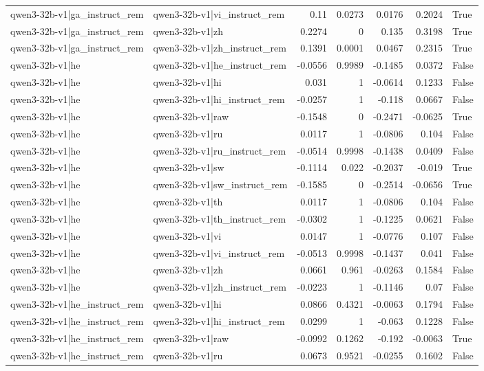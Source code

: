 \begin{table}
\begin{tabular}{l l r r r r l}
qwen3-32b-v1|ga_instruct_rem & qwen3-32b-v1|vi_instruct_rem & 0.11 & 0.0273 & 0.0176 & 0.2024 & True \\
qwen3-32b-v1|ga_instruct_rem & qwen3-32b-v1|zh & 0.2274 & 0 & 0.135 & 0.3198 & True \\
qwen3-32b-v1|ga_instruct_rem & qwen3-32b-v1|zh_instruct_rem & 0.1391 & 0.0001 & 0.0467 & 0.2315 & True \\
qwen3-32b-v1|he & qwen3-32b-v1|he_instruct_rem & -0.0556 & 0.9989 & -0.1485 & 0.0372 & False \\
qwen3-32b-v1|he & qwen3-32b-v1|hi & 0.031 & 1 & -0.0614 & 0.1233 & False \\
qwen3-32b-v1|he & qwen3-32b-v1|hi_instruct_rem & -0.0257 & 1 & -0.118 & 0.0667 & False \\
qwen3-32b-v1|he & qwen3-32b-v1|raw & -0.1548 & 0 & -0.2471 & -0.0625 & True \\
qwen3-32b-v1|he & qwen3-32b-v1|ru & 0.0117 & 1 & -0.0806 & 0.104 & False \\
qwen3-32b-v1|he & qwen3-32b-v1|ru_instruct_rem & -0.0514 & 0.9998 & -0.1438 & 0.0409 & False \\
qwen3-32b-v1|he & qwen3-32b-v1|sw & -0.1114 & 0.022 & -0.2037 & -0.019 & True \\
qwen3-32b-v1|he & qwen3-32b-v1|sw_instruct_rem & -0.1585 & 0 & -0.2514 & -0.0656 & True \\
qwen3-32b-v1|he & qwen3-32b-v1|th & 0.0117 & 1 & -0.0806 & 0.104 & False \\
qwen3-32b-v1|he & qwen3-32b-v1|th_instruct_rem & -0.0302 & 1 & -0.1225 & 0.0621 & False \\
qwen3-32b-v1|he & qwen3-32b-v1|vi & 0.0147 & 1 & -0.0776 & 0.107 & False \\
qwen3-32b-v1|he & qwen3-32b-v1|vi_instruct_rem & -0.0513 & 0.9998 & -0.1437 & 0.041 & False \\
qwen3-32b-v1|he & qwen3-32b-v1|zh & 0.0661 & 0.961 & -0.0263 & 0.1584 & False \\
qwen3-32b-v1|he & qwen3-32b-v1|zh_instruct_rem & -0.0223 & 1 & -0.1146 & 0.07 & False \\
qwen3-32b-v1|he_instruct_rem & qwen3-32b-v1|hi & 0.0866 & 0.4321 & -0.0063 & 0.1794 & False \\
qwen3-32b-v1|he_instruct_rem & qwen3-32b-v1|hi_instruct_rem & 0.0299 & 1 & -0.063 & 0.1228 & False \\
qwen3-32b-v1|he_instruct_rem & qwen3-32b-v1|raw & -0.0992 & 0.1262 & -0.192 & -0.0063 & True \\
qwen3-32b-v1|he_instruct_rem & qwen3-32b-v1|ru & 0.0673 & 0.9521 & -0.0255 & 0.1602 & False \\

\end{tabular}
\end{table}
